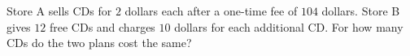 Store A sells CDs for $2$ dollars each after a one-time fee of $104$ dollars. Store B gives $12$ free CDs and charges $10$ dollars for each additional CD. For how many CDs do the two plans cost the same?
